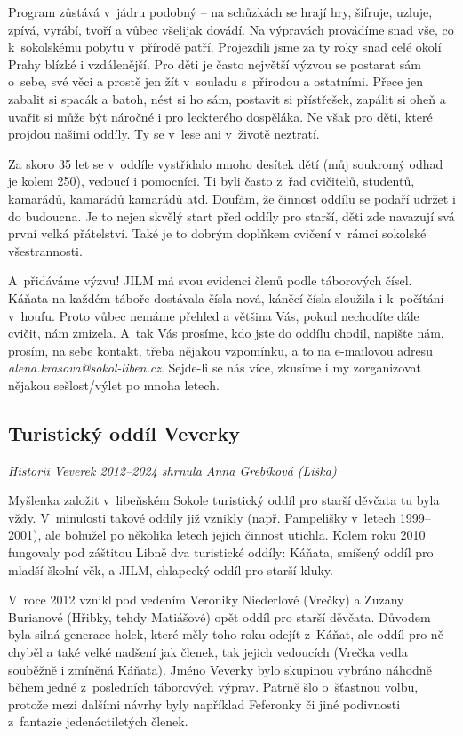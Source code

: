 \documentclass[a5paper, 11pt, twoside]{article}
\begin{document}
Program zůstává v~jádru podobný -- na schůzkách se hrají hry, šifruje,
uzluje, zpívá, vyrábí, tvoří a vůbec všelijak dovádí. Na výpravách
provádíme snad vše, co k~sokolskému pobytu v~přírodě patří. Projezdili
jsme za ty roky snad celé okolí Prahy blízké i vzdálenější. Pro děti je
často největší výzvou se postarat sám o~sebe, své věci a prostě jen žít
v~souladu s~přírodou a ostatními. Přece jen zabalit si spacák a batoh,
nést si ho sám, postavit si přístřešek, zapálit si oheň a uvařit si může
být náročné i pro leckterého dospěláka. Ne však pro děti, které projdou
našimi oddíly. Ty se v~lese ani v~životě neztratí.

Za skoro 35 let se v~oddíle vystřídalo mnoho desítek dětí (můj soukromý
odhad je kolem 250), vedoucí i pomocníci. Ti byli často z~řad cvičitelů,
studentů, kamarádů, kamarádů kamarádů atd. Doufám, že činnost oddílu se
podaří udržet i do budoucna. Je to nejen skvělý start před oddíly pro
starší, děti zde navazují svá první velká přátelství. Také je to dobrým
doplňkem cvičení v~rámci sokolské všestrannosti.

A~přidáváme výzvu! JILM má svou evidenci členů podle táborových
čísel. Káňata na každém táboře dostávala čísla nová, káněcí čísla
sloužila i k~počítání v~houfu. Proto vůbec nemáme přehled a většina Vás,
pokud nechodíte dále cvičit, nám zmizela. A~tak Vás prosíme, kdo jste do
oddílu chodil, napište nám, prosím, na sebe kontakt, třeba nějakou
vzpomínku, a to na e-mailovou adresu
\textit{alena.krasova@sokol-liben.cz}. Sejde-li se nás více, zkusíme
i my zorganizovat nějakou sešlost/výlet po mnoha letech.

\clearpage
\subsection{Turistický oddíl Veverky}

\begin{center}
  \textit{Historii Veverek 2012--2024 shrnula Anna Grebíková (Liška)}
\end{center}

\noindent
Myšlenka založit v~libeňském Sokole turistický oddíl pro starší děvčata
tu byla vždy. V~minulosti takové oddíly již vznikly (např. Pampelišky
v~letech 1999--2001), ale bohužel po několika letech jejich činnost
utichla. Kolem roku 2010 fungovaly pod záštitou Libně dva turistické
oddíly: Káňata, smíšený oddíl pro mladší školní věk, a JILM, chlapecký
oddíl pro starší kluky.

V~roce 2012 vznikl pod vedením Veroniky Niederlové (Vrečky) a Zuzany
Burianové (Hřibky, tehdy Matiášové) opět oddíl pro starší děvčata.
Důvodem byla silná generace holek, které měly toho roku odejít z~Káňat,
ale oddíl pro ně chyběl a také velké nadšení jak členek, tak jejich
vedoucích (Vrečka vedla souběžně i zmíněná Káňata). Jméno Veverky bylo
skupinou vybráno náhodně během jedné z~posledních táborových výprav.
Patrně šlo o~šťastnou volbu, protože mezi dalšími návrhy byly například
Feferonky či jiné podivnosti z~fantazie jedenáctiletých členek.
\end{document}
